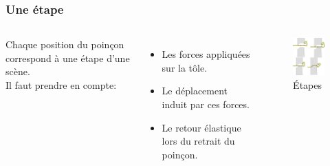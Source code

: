 \documentclass{beamer}
\begin{document}
\begin{frame}
    \frametitle{Une étape}
    \begin{columns}
        Chaque position du poinçon correspond à une étape d'une scène.\\
        Il faut prendre en compte:
        \begin{itemize}
            \item Les forces appliquées sur la tôle.
            \item Le déplacement induit par ces forces.
            \item Le retour élastique lors du retrait du poinçon.
        \end{itemize}
        \begin{figure}
            \includegraphics[width=\textwidth]{img/etape.jpg}
            \caption{Étapes}
            \label{Étape}
        \end{figure}
    \end{columns}
\end{frame}
\end{document}
